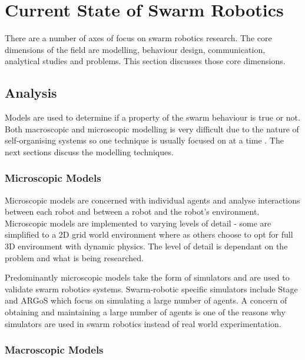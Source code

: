 \section{Current State of Swarm Robotics}
There are a number of axes of focus on swarm robotics research. The core dimensions of the field are modelling, behaviour design, communication, analytical studies and problems. This section discusses those core dimensions. 

\subsection{Analysis}
Models are used to determine if a property of the swarm behaviour is true or not. Both macroscopic and microscopic modelling is very difficult due to the nature of self-organising systems so one technique is usually focused on at a time \cite{abbott2006emergence}. The next sections discuss the modelling techniques.

\subsubsection{Microscopic Models}
\label{microscopicmodels}

Microscopic models are concerned with individual agents and analyse interactions between each robot and between a robot and the robot's environment. Microscopic models are implemented to varying levels of detail - some are simplified to a 2D grid world environment where as others choose to opt for full 3D environment with dynamic physics. The level of detail is dependant on the problem and what is being researched.

Predominantly microscopic models take the form of simulators and are used to validate swarm robotics systems. Swarm-robotic specific simulators include Stage \cite{vaughan2008massively} and ARGoS \cite{pinciroli2011argos} which focus on simulating a large number of agents. A concern of obtaining and maintaining a large number of agents is one of the reasons why simulators are used in swarm robotics instead of real world experimentation.

\subsubsection{Macroscopic Models}
\label{macroscopicmodels}

